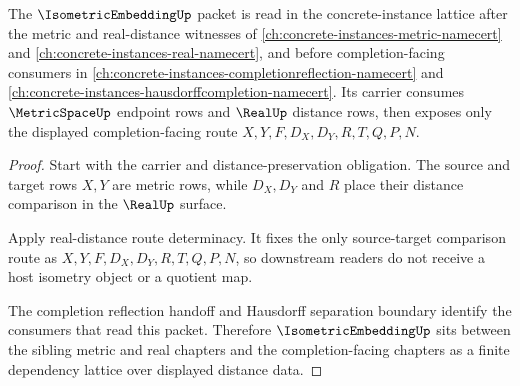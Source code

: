 \begin{theorem}
\label{thm:isometric-embedding-sibling-completion-lattice}
The $\IsometricEmbeddingUp$ packet is read in the concrete-instance lattice after the metric and real-distance witnesses of \autoref{ch:concrete-instances-metric-namecert} and \autoref{ch:concrete-instances-real-namecert}, and before completion-facing consumers in \autoref{ch:concrete-instances-completionreflection-namecert} and \autoref{ch:concrete-instances-hausdorffcompletion-namecert}. Its carrier consumes $\MetricSpaceUp$ endpoint rows and $\RealUp$ distance rows, then exposes only the displayed completion-facing route $X,Y,F,D_X,D_Y,R,T,Q,P,N$.
\end{theorem}
\begin{proof}
Start with the carrier and distance-preservation obligation. The source and target rows $X,Y$ are metric rows, while $D_X,D_Y$ and $R$ place their distance comparison in the $\RealUp$ surface.

Apply real-distance route determinacy. It fixes the only source-target comparison route as $X,Y,F,D_X,D_Y,R,T,Q,P,N$, so downstream readers do not receive a host isometry object or a quotient map.

The completion reflection handoff and Hausdorff separation boundary identify the consumers that read this packet. Therefore $\IsometricEmbeddingUp$ sits between the sibling metric and real chapters and the completion-facing chapters as a finite dependency lattice over displayed distance data.
\end{proof}

